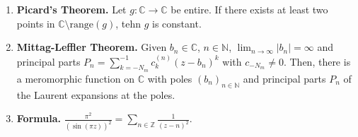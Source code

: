 \begin{enumerate}
	\item \textbf{Picard's Theorem. } Let $g: \mathbb{C} \to \mathbb{C}$ be entire. If there exists at least two points in $\mathbb{C} \setminus \textrm{range}(g)$, tehn $g$ is constant. 
	\item \textbf{Mittag-Leffler Theorem. } Given $b_n \in \mathbb{C}$, $n \in \mathbb{N}$, $\lim_{n \to \infty} |b_n| = \infty$ and principal parts $P_n = \sum_{k=-N_m}^{-1} c_k^{(n)}(z-b_n)^k$ with $c_{-N_m} \neq 0$. Then, there is a meromorphic function on $\mathbb{C}$ with poles $(b_n)_{n \in \mathbb{N}}$ and principal parts $P_n$ of the Laurent expansions at the poles. 
	\item \textbf{Formula. } $\frac{\pi^2}{(\sin(\pi z))^2} = \sum_{n \in \mathbb{Z}} \frac{1}{(z-n)^2}$. 
\end{enumerate}  
 

